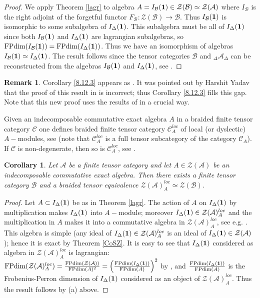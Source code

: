 \documentclass{amsart}
\newtheorem{corollary}[theorem]{Corollary}
\theoremstyle{definition}
\newtheorem{remark}[theorem]{Remark}
\newcommand{\C}{\mathcal{C}}
\newcommand{\cZ}{\mathcal{Z}}
\newcommand{\A}{\mathcal{A}}
\newcommand{\B}{\mathcal{B}}
\newcommand{\FP}{\text{FPdim}}
\newcommand{\be}{{\bf 1}}
\numberwithin{equation}{section}
\begin{document}
\begin{proof}
    We apply Theorem \ref{lagr} to algebra $A=I_\B(\be)\in \cZ(\B)\simeq \cZ(\A)$ 
    where $I_\B$ is the right adjoint of the forgetful functor $F_\B: \cZ(\B)\to \B$.
    Thus $I_\B(\be)$ is isomorphic to some subalgebra of $I_\Delta(\be)$. This subalgebra
    must be all of $I_\Delta(\be)$ since both $I_\B(\be)$ and $I_\Delta(\be)$ are
    lagrangian subalgebras, so $\FP(I_\B(\be))=\FP(I_\Delta(\be))$. 
    Thus we have an isomorphism of algebras $I_\B(\be)\simeq I_\Delta(\be)$. The result follows
    since the tensor categories $\B$ and $\phantom{}_\Delta \A_\Delta$ can be 
    reconstructed from the algebras $I_\B(\be)$ and $I_\Delta(\be)$, see \cite[Lemma 8.12.2(ii)]{EGNO}.
\end{proof}

\begin{remark}
    Corollary \ref{8.12.3} appears as \cite[Theorem 8.12.3]{EGNO}. It was pointed out
    by Harshit Yadav that the proof of this result in \cite{EGNO} is incorrect; thus
    Corollary \ref{8.12.3} fills this gap. Note that this new proof uses
    the results of \cite{CSZ} in a crucial way.
\end{remark}

Given an indecomposable commutative exact algebra $A$ in a braided finite tensor category
$\C$ one defines braided finite tensor category $\C_A^{loc}$ of local (or dyslectic) 
$A-$modules, see \cite[2.3]{ShYa} (note that $\C_A^{loc}$ is a full tensor subcategory
of the category $\C_A$). If $\C$ is non-degenerate, then so is $\C_A^{loc}$,
see \cite[Corollary 5.14(b)]{ShYa}.

\begin{corollary}\label{local}
    Let $\A$ be a finite tensor category and let $A\in \cZ(\A)$ be an indecomposable
    commutative exact algebra. Then there exists a finite tensor category $\B$ and
    a braided tensor equivalence $\cZ(\A)_A^{loc}\simeq \cZ(\B)$.
\end{corollary}

\begin{proof}
    Let $A\subset I_\Delta(\be)$ be as in Theorem \ref{lagr}. The action of $A$ on
    $I_\Delta(\be)$ by multiplication makes $I_\Delta(\be)$ into $A-$module; moreover
    $I_\Delta(\be)\in \cZ(\A)_A^{loc}$ and the multiplication in $A$ makes it into
    a commutative algebra in $\cZ(\A)_A^{loc}$, see e.g. \cite[3.6(c)]{DMNO}. 
    This algebra is simple (any ideal of $I_\Delta(\be)\in \cZ(\A)_A^{loc}$ is an ideal
    of $I_\Delta(\be)\in \cZ(\A)$); hence it is exact by Theorem \ref{CoSZ}. 
    It is easy to see that $I_\Delta(\be)$ considered as algebra in $\cZ(\A)_A^{loc}$
    is lagrangian: $\FP(\cZ(\A)_A^{loc})=\frac{\FP(\cZ(\A))}{\FP(A)^2}=\left(\frac{\FP(I_\Delta(\be))}{\FP(A)}\right)^2$ by \cite[Lemma 5.17]{ShYa},
    and $\frac{\FP(I_\Delta(\be))}{\FP(A)}$ is the Frobenius-Perron dimension 
    of $I_\Delta(\be)$ considered as an object of $\cZ(\A)_A^{loc}$. Thus the result
    follows by (a) above.
\end{proof}
\end{document}

